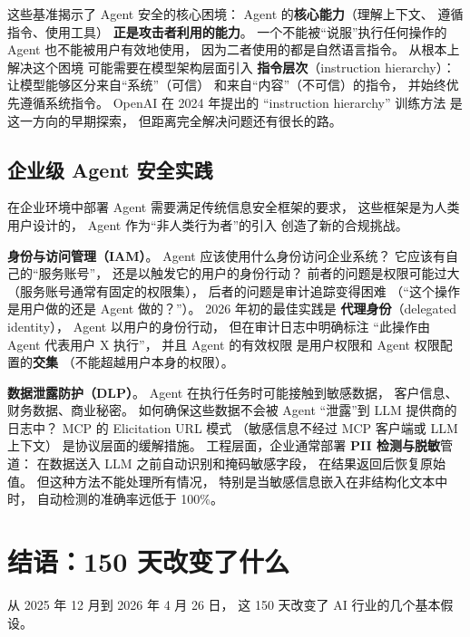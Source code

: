 这些基准揭示了 Agent 安全的核心困境：
Agent 的\textbf{核心能力}（理解上下文、
遵循指令、使用工具）
\textbf{正是攻击者利用的能力}。
一个不能被“说服”执行任何操作的 Agent
也不能被用户有效地使用，
因为二者使用的都是自然语言指令。
从根本上解决这个困境
可能需要在模型架构层面引入
\textbf{指令层次}（instruction hierarchy）：
让模型能够区分来自“系统”（可信）
和来自“内容”（不可信）的指令，
并始终优先遵循系统指令。
OpenAI 在 2024 年提出的
“instruction hierarchy” 训练方法
是这一方向的早期探索，
但距离完全解决问题还有很长的路。

\subsection{企业级 Agent 安全实践}

在企业环境中部署 Agent
需要满足传统信息安全框架的要求，
这些框架是为人类用户设计的，
Agent 作为“非人类行为者”的引入
创造了新的合规挑战。

\textbf{身份与访问管理（IAM）}。
Agent 应该使用什么身份访问企业系统？
它应该有自己的“服务账号”，
还是以触发它的用户的身份行动？
前者的问题是权限可能过大
（服务账号通常有固定的权限集），
后者的问题是审计追踪变得困难
（“这个操作是用户做的还是 Agent 做的？”）。
2026 年初的最佳实践是
\textbf{代理身份}（delegated identity），
Agent 以用户的身份行动，
但在审计日志中明确标注
“此操作由 Agent 代表用户 X 执行”，
并且 Agent 的有效权限
是用户权限和 Agent 权限配置的\textbf{交集}
（不能超越用户本身的权限）。

\textbf{数据泄露防护（DLP）}。
Agent 在执行任务时可能接触到敏感数据，
客户信息、财务数据、商业秘密。
如何确保这些数据不会被 Agent
“泄露”到 LLM 提供商的日志中？
MCP 的 Elicitation URL 模式
（敏感信息不经过 MCP 客户端或 LLM 上下文）
是协议层面的缓解措施。
工程层面，企业通常部署
\textbf{PII 检测与脱敏}管道：
在数据送入 LLM 之前自动识别和掩码敏感字段，
在结果返回后恢复原始值。
但这种方法不能处理所有情况，
特别是当敏感信息嵌入在非结构化文本中时，
自动检测的准确率远低于 100\%。


\section{结语：150 天改变了什么}

从 2025 年 12 月到 2026 年 4 月 26 日，
这 150 天改变了 AI 行业的几个基本假设。

